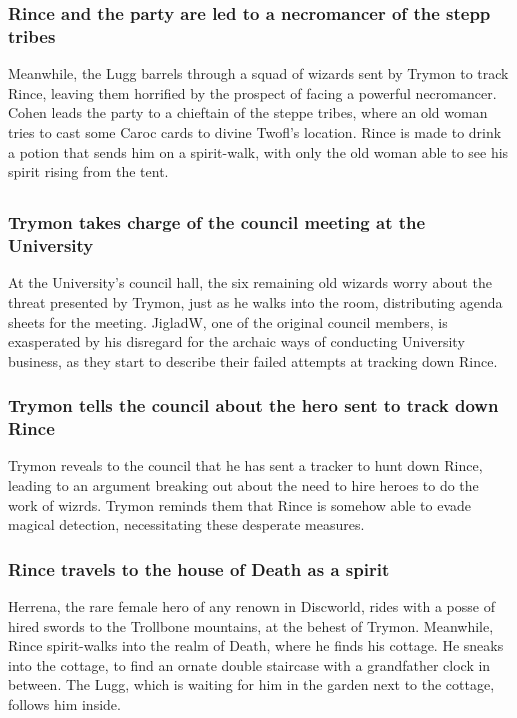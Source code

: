 \subsubsection{\Gls{Rince} and the party are led to a necromancer of the stepp tribes}
Meanwhile, the \Gls{Lugg} barrels through a squad of wizards sent by \Gls{Trymon} to track
\Gls{Rince}, leaving them horrified by the prospect of facing a powerful necromancer. \Gls{Cohen}
leads the party to a chieftain of the steppe tribes, where an old woman tries to cast some Caroc
cards to divine \Gls{Twofl}'s location. \Gls{Rince} is made to drink a potion that sends him on a
spirit-walk, with only the old woman able to see his spirit rising from the tent.

\subsection{}
\subsubsection{\Gls{Trymon} takes charge of the council meeting at the University}
At the University's council hall, the six remaining old wizards worry about the threat presented by
\Gls{Trymon}, just as he walks into the room, distributing agenda sheets for the meeting.
\Gls{JigladW}, one of the original council members, is exasperated by his disregard for the archaic
ways of conducting University business, as they start to describe their failed attempts at tracking
down \Gls{Rince}.

\subsubsection{\Gls{Trymon} tells the council about the hero sent to track down \Gls{Rince}}
\Gls{Trymon} reveals to the council that he has sent a tracker to hunt down \Gls{Rince}, leading to
an argument breaking out about the need to hire heroes to do the work of wizrds. \Gls{Trymon}
reminds them that \Gls{Rince} is somehow able to evade magical detection, necessitating these
desperate measures.

\subsubsection{\Gls{Rince} travels to the house of \Gls{Death} as a spirit}
\Gls{Herrena}, the rare female hero of any renown in Discworld, rides with a posse of hired swords
to the Trollbone mountains, at the behest of \Gls{Trymon}. Meanwhile, \Gls{Rince} spirit-walks into
the realm of \Gls{Death}, where he finds his cottage. He sneaks into the cottage, to find an ornate
double staircase with a grandfather clock in between. The \Gls{Lugg}, which is waiting for him in
the garden next to the cottage, follows him inside.

